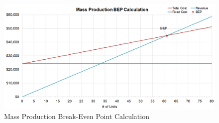 \begin{figure}[H]
\centering
    \includegraphics[width=\linewidth]{./images/mp.png}
    \caption{Mass Production Break-Even Point Calculation}
\end{figure}

